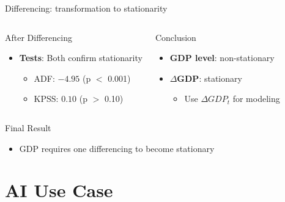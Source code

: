 \documentclass[9pt, aspectratio=169, t]{beamer}
\begin{document}
\begin{frame}{Differencing: transformation to stationarity}
    \begin{columns}[T]
        \begin{alertblock}{After Differencing}
            \begin{itemize}\setlength{\itemsep}{0pt}
                \item \textbf{Tests}: Both confirm stationarity
                \begin{itemize}
                    \item ADF: $-4.95$ (p $<$ 0.001)
                    \item KPSS: $0.10$ (p $>$ 0.10)
                \end{itemize}
            \end{itemize}
        \end{alertblock}
        \begin{exampleblock}{Conclusion}
            \begin{itemize}\setlength{\itemsep}{0pt}
                \item \textbf{GDP level}: non-stationary
                \item \textbf{$\Delta$GDP}: stationary
                \begin{itemize}
                    \item Use $\Delta GDP_t$ for modeling
                \end{itemize}
            \end{itemize}
        \end{exampleblock}
    \end{columns}
    \vspace{0.2cm}
    \begin{block}{Final Result}
        \begin{itemize}\setlength{\itemsep}{0pt}
            \item GDP requires one differencing to become stationary
        \end{itemize}
    \end{block}
\end{frame}

\section{AI Use Case}
\end{document}
